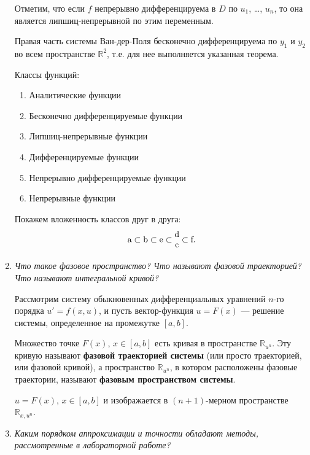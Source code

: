 \documentclass[12pt, a4paper]{article}
\begin{document}
\begin{enumerate}
		Отметим, что если $f$ непрерывно дифференцируема в $D$ по $u_1$, \dots, $u_n$, то она является липшиц-непрерывной по этим переменным.
		
		Правая часть системы Ван-дер-Поля бесконечно дифференцируема по $y_1$ и $y_2$ во всем пространстве $\mathbb{R}^2$, т.е. для нее выполняется указанная теорема.
		
		Классы функций:
		\begin{enumerate}
			\item Аналитические функции
			\item Бесконечно дифференцируемые функции
			\item Липшиц-непрерывные функции
			\item Дифференцируемые функции
			\item Непрерывно дифференцируемые функции
			\item Непрерывные функции
		\end{enumerate}
		
		Покажем вложенность классов друг в друга:	
		\[\textup a\subset\textup b\subset\textup e\subset\begin{matrix}\textup d \\ \textup c\end{matrix}\subset\textup f.\]
		
		\item \textit{Что такое фазовое пространство? Что называют фазовой траекторией? Что называют интегральной кривой?}
		\smallskip
		
		Рассмотрим систему обыкновенных дифференциальных уравнений $n$-го порядка $u' = f(x, u)$, и пусть вектор-функция $u = F(x)$ --- решение системы, определенное на промежутке $[a, b]$.
		
		Множество точке $F(x)$, $x \in [a, b]$ есть кривая в пространстве $\mathbb{R}_{u^n}$. Эту кривую называют \textbf{фазовой траекторией системы} (или просто траекторией, или фазовой кривой), а пространство $\mathbb{R}_{u^n}$, в котором расположены фазовые траектории, называют \textbf{фазовым пространством системы}.
		
		 $u = F(x)$, $x \in [a, b]$ и изображается в $(n+1)$-мерном пространстве $\mathbb{R}_{x, u^n}$.
		
		
		\item \textit{Каким порядком аппроксимации и точности обладают	методы, рассмотренные в лабораторной работе?}
		\smallskip
		

\end{enumerate}
\end{document}

